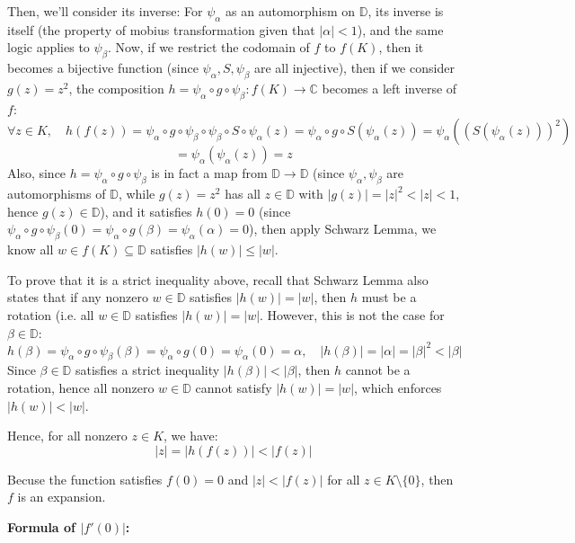 \documentclass{article}
\begin{document}
\begin{itemize}
    Then, we'll consider its inverse: 
    For $\psi_\alpha$ as an automorphism on $\mathbb{D}$, its inverse is itself (the property of mobius transformation given that $|\alpha|<1$), and the same logic applies to $\psi_\beta$.
    Now, if we restrict the codomain of $f$ to $f(K)$, then it becomes a bijective function (since $\psi_\alpha, S,\psi_\beta$ are all injective), then if we consider $g(z)=z^2$,
    the composition $h=\psi_\alpha\circ g\circ\psi_\beta:f(K)\rightarrow \mathbb{C}$ becomes a left inverse of $f$:
    $$\forall z\in K,\quad h(f(z))=\psi_\alpha\circ g\circ\psi_\beta\circ\psi_\beta\circ S\circ \psi_\alpha(z) = \psi_\alpha\circ g\circ S(\psi_\alpha(z)) = \psi_\alpha((S(\psi_\alpha(z)))^2)$$
    $$ = \psi_\alpha(\psi_\alpha(z))=z$$
    Also, since $h=\psi_\alpha\circ g\circ \psi_\beta$ is in fact a map from $\mathbb{D}\rightarrow\mathbb{D}$ (since $\psi_\alpha,\psi_\beta$ are automorphisms of $\mathbb{D}$, while $g(z)=z^2$ has all $z\in\mathbb{D}$ with $|g(z)|=|z|^2<|z|<1$, hence $g(z)\in\mathbb{D}$),
    and it satisfies $h(0)=0$ (since $\psi_\alpha\circ g\circ \psi_\beta(0)=\psi_\alpha\circ g(\beta)=\psi_\alpha(\alpha)=0$),
    then apply Schwarz Lemma, we know all $w\in f(K)\subseteq\mathbb{D}$ satisfies $|h(w)|\leq |w|$. 

    To prove that it is a strict inequality above, recall that Schwarz Lemma also states that if any nonzero $w\in\mathbb{D}$ satisfies $|h(w)|=|w|$, then $h$ must be a rotation (i.e. all $w\in\mathbb{D}$ satisfies $|h(w)|=|w|$. However, this is not the case for $\beta\in\mathbb{D}$:
    $$h(\beta)=\psi_\alpha\circ g\circ\psi_{\beta}(\beta) = \psi_\alpha\circ g(0)=\psi_\alpha(0)=\alpha,\quad |h(\beta)|=|\alpha|=|\beta|^2 < |\beta|$$
    Since $\beta\in\mathbb{D}$ satisfies a strict inequality $|h(\beta)|<|\beta|$, then $h$ cannot be a rotation, hence all nonzero $w\in\mathbb{D}$ cannot satisfy $|h(w)|=|w|$, which enforces $|h(w)|<|w|$.

    Hence, for all nonzero $z\in K$, we have:
    $$|z|=|h(f(z))|< |f(z)|$$

    Becuse the function satisfies $f(0)=0$ and $|z|< |f(z)|$ for all $z\in K\setminus\{0\}$, then $f$ is an expansion.

    \hfil

    \textbf{Formula of $|f'(0)|$:}


\end{itemize}
\end{document}
